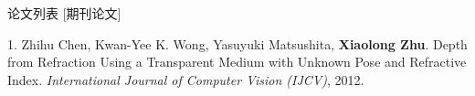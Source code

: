 \documentclass{cv_professional-cn} %
\makeatletter
\newlength{\bibhang}
\newlength{\bibsep}
 {\@listi \global\bibsep\itemsep \global\advance\bibsep by\parsep}
\newenvironment{bibsection}%
        {\vspace{\itemsep}\begin{list}{}{%
       \setlength{\leftmargin}{\bibhang}%
       \setlength{\itemsep}{\bibsep}%
       \setlength{\parsep}{\z@}%
        \setlength{\partopsep}{0pt}%
        \setlength{\topsep}{0pt}}}
        {\end{list}\vspace{\itemsep}}
\makeatother
\begin{document}
\begin{rSection}{论文列表}
[期刊论文]

\begin{bibsection}

    \item[1.] Zhihu Chen, Kwan-Yee K. Wong, Yasuyuki Matsushita, \textbf{Xiaolong Zhu}. Depth from Refraction Using a Transparent Medium with Unknown Pose and Refractive Index. \emph{International Journal of Computer Vision (IJCV)}, 2012.

\end{bibsection}

\end{rSection}



\end{document}
